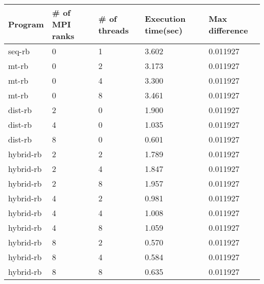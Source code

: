 \documentclass[11pt]{article}
\begin{document}
\begin{center}
  \begin{tabular}{| l | l | l | l | l |}
    \hline
    Program & \# of MPI ranks & \# of threads & Execution time(sec) & Max difference
    \\ \hline
    seq-rb & 0 & 1 & 3.602  & 0.011927 \\ \hline
    mt-rb & 0 & 2 & 3.173  & 0.011927 \\ \hline
    mt-rb & 0 & 4 & 3.300 & 0.011927 \\ \hline
    mt-rb & 0 & 8 & 3.461 & 0.011927 \\ \hline
    dist-rb & 2 & 0 & 1.900 & 0.011927 \\ \hline
    dist-rb & 4 & 0 & 1.035 & 0.011927 \\ \hline
    dist-rb & 8 & 0 & 0.601 & 0.011927 \\ \hline
    hybrid-rb & 2 & 2 & 1.789 & 0.011927 \\ \hline
    hybrid-rb & 2 & 4 & 1.847 & 0.011927  \\ \hline
    hybrid-rb & 2 & 8 & 1.957 & 0.011927 \\ \hline
    hybrid-rb & 4 & 2 & 0.981 & 0.011927 \\ \hline
    hybrid-rb & 4 & 4 & 1.008 & 0.011927 \\ \hline
    hybrid-rb & 4 & 8 & 1.059 & 0.011927 \\ \hline
    hybrid-rb & 8 & 2 & 0.570 & 0.011927 \\ \hline
    hybrid-rb & 8 & 4 & 0.584 & 0.011927 \\ \hline
    hybrid-rb & 8 & 8 & 0.635 & 0.011927 \\ \hline
  \end{tabular}
\end{center}
\end{document}

